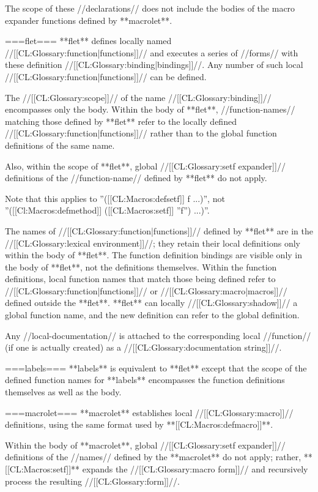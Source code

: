 The scope of these //declarations// does not include the bodies of the macro expander functions defined by **macrolet**.

===flet===
**flet** defines locally named //[[CL:Glossary:function|functions]]// and executes a series of //forms// with these definition //[[CL:Glossary:binding|bindings]]//. Any number of such local //[[CL:Glossary:function|functions]]// can be defined.

The //[[CL:Glossary:scope]]// of the name //[[CL:Glossary:binding]]// encompasses only the body. Within the body of **flet**, //function-names// matching those defined by **flet** refer to the locally defined //[[CL:Glossary:function|functions]]// rather than to the global function definitions of the same name.

Also, within the scope of **flet**, global //[[CL:Glossary:setf expander]]// definitions of the //function-name// defined by **flet** do not apply.

Note that this applies to ''([[CL:Macros:defsetf]] f ...)'', not ''([[Cl:Macros:defmethod]] ([[CL:Macros:setf]] ''f'') ...)''.

The names of //[[CL:Glossary:function|functions]]// defined by **flet** are in the //[[CL:Glossary:lexical environment]]//; they retain their local definitions only within the body of **flet**. The function definition bindings are visible only in the body of **flet**, not the definitions themselves. Within the function definitions, local function names that match those being defined refer to //[[CL:Glossary:function|functions]]// or //[[CL:Glossary:macro|macros]]// defined outside the **flet**. **flet** can locally //[[CL:Glossary:shadow]]// a global function name, and the new definition can refer to the global definition.

Any //local-documentation// is attached to the corresponding local //function// (if one is actually created) as a //[[CL:Glossary:documentation string]]//.

===labels===
**labels** is equivalent to **flet** except that the scope of the defined function names for **labels** encompasses the function definitions themselves as well as the body.

===macrolet===
**macrolet** establishes local //[[CL:Glossary:macro]]// definitions, using the same format used by **[[CL:Macros:defmacro]]**.

Within the body of **macrolet**, global //[[CL:Glossary:setf expander]]// definitions of the //names// defined by the **macrolet** do not apply; rather, **[[CL:Macros:setf]]** expands the //[[CL:Glossary:macro form]]// and recursively process the resulting //[[CL:Glossary:form]]//.

